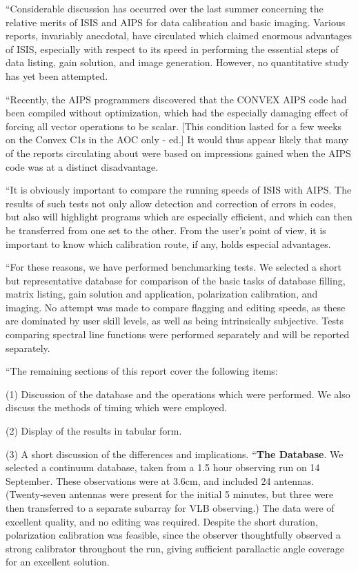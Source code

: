 {\narrower
``Considerable discussion has occurred over the last summer concerning the
relative merits of ISIS and AIPS for data calibration and basic imaging.
Various reports, invariably anecdotal, have circulated which claimed enormous
advantages of ISIS, especially with respect to its speed in performing the
essential steps of data listing, gain solution, and image generation.
However, no quantitative study has yet been attempted.

``Recently, the AIPS programmers discovered that the CONVEX AIPS code had been
compiled without optimization, which had the especially damaging effect of
forcing all vector operations to be scalar.
[This condition lasted for a few weeks on the Convex C1s in the AOC
only - ed.]
It would thus appear likely that
many of the reports circulating about were based on impressions gained when
the AIPS code was at a distinct disadvantage.

``It is obviously important to compare the running speeds of ISIS with AIPS.
The results of such tests not only allow detection and correction of errors in
codes, but also will highlight programs which are especially efficient, and
which can then be transferred from one set to the other.  From the user's
point of view, it is important to know which calibration route, if any, holds
especial advantages.

``For these reasons, we have performed benchmarking tests.  We selected a short
but representative database for comparison of the basic tasks of database
filling, matrix listing, gain solution and application, polarization
calibration, and imaging.  No attempt was made to compare flagging and
editing speeds, as these are dominated by user skill levels, as well as being
intrinsically subjective.  Tests comparing spectral line functions were
performed separately and will be reported separately.

``The remaining sections of this report cover the following items:

(1) Discussion of the database and the operations which were performed. We
also discuss the methods of timing which were employed.

(2) Display of the results in tabular form.

(3) A short discussion of the differences and implications.
\medskip
``{\bf The Database}.  We selected a continuum database, taken from a 1.5
hour observing run on 14 September.  These observations were at 3.6cm, and
included 24 antennas.  (Twenty-seven antennas were present for the initial 5
minutes, but three were then transferred to a separate subarray for VLB
observing.)  The data were of excellent quality, and no editing was
required.  Despite the short duration, polarization calibration was feasible,
since the observer thoughtfully observed a strong calibrator throughout the
run, giving sufficient parallactic angle coverage for an excellent solution.

}
